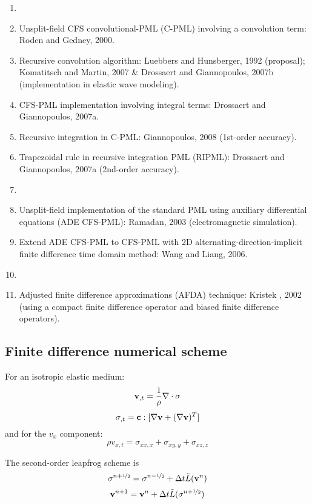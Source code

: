 \begin{enumerate}[\hspace{10mm}*]
  \item \sline
  \item Unsplit-field CFS convolutional-PML (C-PML)
    involving a convolution term: Roden and Gedney, 2000.
  \item Recursive convolution algorithm:
    Luebbers and Hunsberger, 1992 (proposal);
    Komatitsch and Martin, 2007 \& Drossaert and Giannopoulos, 2007b
    (implementation in elastic wave modeling).
  \item CFS-PML implementation involving integral terms:
    Drossaert and Giannopoulos, 2007a.
  \item Recursive integration in C-PML: Giannopoulos, 2008 (1st-order accuracy).
  \item Trapezoidal rule in recursive integration PML (RIPML):
    Drossaert and Giannopoulos, 2007a (2nd-order accuracy).
  \item \sline
  \item Unsplit-field implementation of the standard PML
    using auxiliary differential equations (ADE CFS-PML):
    Ramadan, 2003 (electromagnetic simulation).
  \item Extend ADE CFS-PML to CFS-PML with 2D alternating-direction-implicit
    finite difference time domain method: Wang and Liang, 2006.
  \item \sline 
  \item Adjusted finite difference approximations (AFDA) technique:
    Kristek \etal, 2002 (using a compact finite difference operator and
    biased finite difference operators).
\end{enumerate}

\subsection{Finite difference numerical scheme}
For an isotropic elastic medium:
\[ \mathbf{v}_{,t}=\frac{1}{\rho}\nabla\cdot\mathbf{\sigma} \]
\[ \mathbf{\sigma}_{,t}=\mathbf{c}:[\nabla\mathbf{v}+(\nabla\mathbf{v})^T] \]
and for the $v_x$ component:
\[ \rho v_{x,t}=\sigma_{xx,x}+\sigma_{xy,y}+\sigma_{xz,z} \]

The second-order leapfrog scheme is
\[ \mathbf{\sigma}^{n+\nicefrac{1}{2}}=\mathbf{\sigma}^{n-\nicefrac{1}{2}}+\Delta t\tilde{L}(\mathbf{v}^n) \]
\[ \mathbf{v}^{n+1}=\mathbf{v}^n+\Delta t\tilde{L}(\mathbf{\sigma}^{n+\nicefrac{1}{2}}) \]

